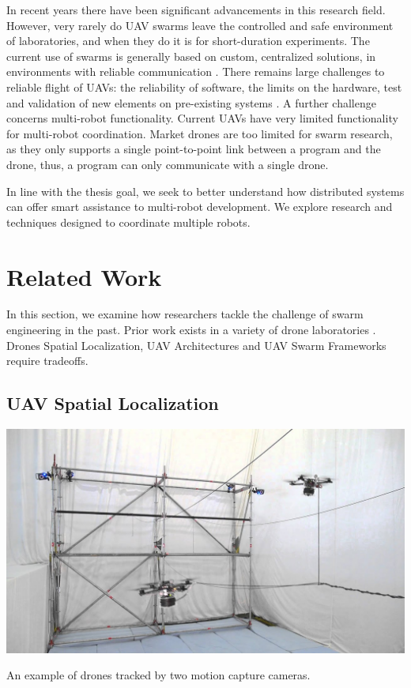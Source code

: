 In recent years there have been significant advancements in this research field. However, very rarely do UAV swarms leave the controlled and safe environment of laboratories, and when they do it is for short-duration experiments. The current use of swarms is generally based on custom, centralized solutions, in environments with reliable communication \cite{buzz_swarm_stack}. There remains large challenges to reliable flight of UAVs: the reliability of software, the limits on the hardware, test and validation of new elements on pre-existing systems \cite{gcs_validation}. A further challenge concerns multi-robot functionality. Current UAVs have very limited functionality for multi-robot coordination. Market drones are too limited for swarm research, as they only supports a single point-to-point link between a program and the drone, thus, a program can only communicate with a single drone. 

In line with the thesis goal, we seek to better understand how distributed systems can offer smart assistance to multi-robot development. We explore research and techniques designed to coordinate multiple robots.



\pagebreak
\section{Related Work}

In this section, we examine how researchers tackle the challenge of swarm engineering in the past. Prior work exists in a variety of drone laboratories \cite{flightmare} \cite{fma_paper}. Drones Spatial Localization, UAV Architectures and UAV Swarm Frameworks require tradeoffs.

\subsection{UAV Spatial Localization}

\begin{marginfigure}%
  \includegraphics[width=\linewidth]{images/drones_setup.jpg}
  \caption{An example of drones tracked by two motion capture cameras.  }
\end{marginfigure}

